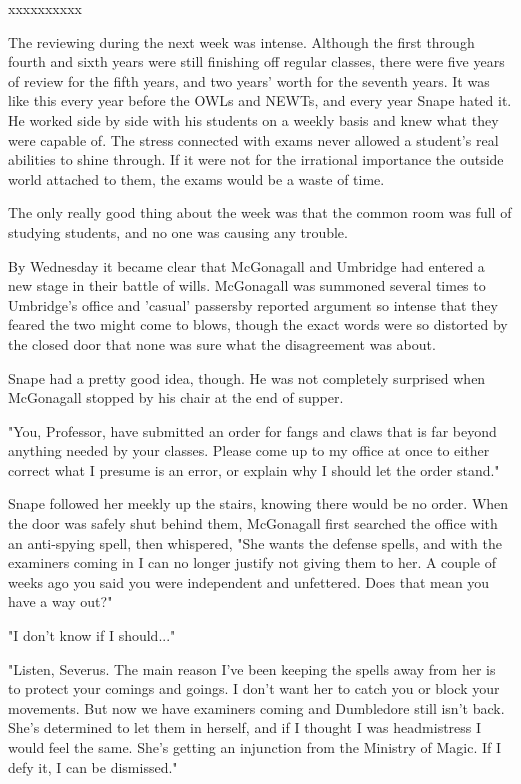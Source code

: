 \documentclass[a4paper,11pt]{article}
\begin{document}
xxxxxxxxxx

The reviewing during the next week was intense. Although the first through fourth and sixth years were still finishing off regular classes, there were five years of review for the fifth years, and two years' worth for the seventh years. It was like this every year before the OWLs and NEWTs, and every year Snape hated it. He worked side by side with his students on a weekly basis and knew what they were capable of. The stress connected with exams never allowed a student's real abilities to shine through. If it were not for the irrational importance the outside world attached to them, the exams would be a waste of time.

The only really good thing about the week was that the common room was full of studying students, and no one was causing any trouble.

By Wednesday it became clear that McGonagall and Umbridge had entered a new stage in their battle of wills. McGonagall was summoned several times to Umbridge's office and 'casual' passersby reported argument so intense that they feared the two might come to blows, though the exact words were so distorted by the closed door that none was sure what the disagreement was about.

Snape had a pretty good idea, though. He was not completely surprised when McGonagall stopped by his chair at the end of supper.

"You, Professor, have submitted an order for fangs and claws that is far beyond anything needed by your classes. Please come up to my office at once to either correct what I presume is an error, or explain why I should let the order stand."

Snape followed her meekly up the stairs, knowing there would be no order. When the door was safely shut behind them, McGonagall first searched the office with an anti-spying spell, then whispered, "She wants the defense spells, and with the examiners coming in I can no longer justify not giving them to her. A couple of weeks ago you said you were independent and unfettered. Does that mean you have a way out?"

"I don't know if I should..."

"Listen, Severus. The main reason I've been keeping the spells away from her is to protect your comings and goings. I don't want her to catch you or block your movements. But now we have examiners coming and Dumbledore still isn't back. She's determined to let them in herself, and if I thought I was headmistress I would feel the same. She's getting an injunction from the Ministry of Magic. If I defy it, I can be dismissed."
\end{document}
